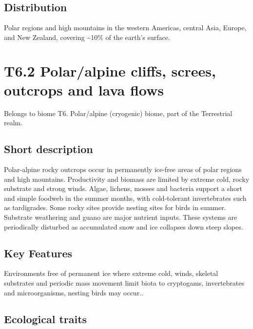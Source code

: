 \documentclass[
  letterpaper,
  DIV=11,
  numbers=noendperiod]{scrartcl}
\begin{document}
\subsection{Distribution}\label{distribution-93}

Polar regions and high mountains in the western Americas, central Asia,
Europe, and New Zealand, covering \textasciitilde10\% of the earth's
surface.

\section{T6.2 Polar/alpine cliffs, screes, outcrops and lava
flows}\label{t6.2-polaralpine-cliffs-screes-outcrops-and-lava-flows}

Belongs to biome T6. Polar/alpine (cryogenic) biome, part of the
Terrestrial realm.

\subsection{Short description}\label{short-description-94}

Polar-alpine rocky outcrops occur in permanently ice-free areas of polar
regions and high mountains. Productivity and biomass are limited by
extreme cold, rocky substrate and strong winds. Algae, lichens, mosses
and bacteria support a short and simple foodweb in the summer months,
with cold-tolerant invertebrates such as tardigrades. Some rocky sites
provide nesting sites for birds in summer. Substrate weathering and
guano are major nutrient inputs. These systems are periodically
disturbed as accumulated snow and ice collapses down steep slopes.

\subsection{Key Features}\label{key-features-94}

Environments free of permanent ice where extreme cold, winds, skeletal
substrates and periodic mass movement limit biota to cryptogams,
invertebrates and microorganisms, nesting birds may occur..

\subsection{Ecological traits}\label{ecological-traits-94}
\end{document}
